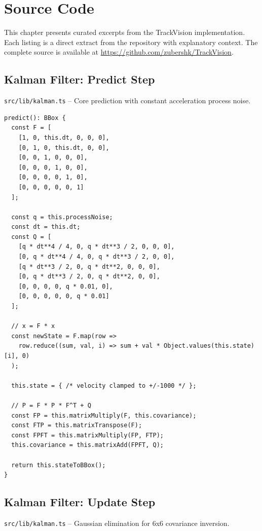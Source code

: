 \chapter{Source Code}
\label{ch:source-code}

This chapter presents curated excerpts from the TrackVision implementation. Each listing is a direct extract from the repository with explanatory context. The complete source is available at \url{https://github.com/zubershk/TrackVision}.

\section{Kalman Filter: Predict Step}
\label{sec:code-kf-predict}
\texttt{src/lib/kalman.ts} -- Core prediction with constant acceleration process noise.

\begin{lstlisting}[style=typescript, caption={KalmanFilter.predict()}, label={lst:kf-predict}]
predict(): BBox {
  const F = [
    [1, 0, this.dt, 0, 0, 0],
    [0, 1, 0, this.dt, 0, 0],
    [0, 0, 1, 0, 0, 0],
    [0, 0, 0, 1, 0, 0],
    [0, 0, 0, 0, 1, 0],
    [0, 0, 0, 0, 0, 1]
  ];

  const q = this.processNoise;
  const dt = this.dt;
  const Q = [
    [q * dt**4 / 4, 0, q * dt**3 / 2, 0, 0, 0],
    [0, q * dt**4 / 4, 0, q * dt**3 / 2, 0, 0],
    [q * dt**3 / 2, 0, q * dt**2, 0, 0, 0],
    [0, q * dt**3 / 2, 0, q * dt**2, 0, 0],
    [0, 0, 0, 0, q * 0.01, 0],
    [0, 0, 0, 0, 0, q * 0.01]
  ];

  // x = F * x
  const newState = F.map(row =>
    row.reduce((sum, val, i) => sum + val * Object.values(this.state)[i], 0)
  );

  this.state = { /* velocity clamped to +/-1000 */ };

  // P = F * P * F^T + Q
  const FP = this.matrixMultiply(F, this.covariance);
  const FTP = this.matrixTranspose(F);
  const FPFT = this.matrixMultiply(FP, FTP);
  this.covariance = this.matrixAdd(FPFT, Q);

  return this.stateToBBox();
}
\end{lstlisting}

\section{Kalman Filter: Update Step}
\label{sec:code-kf-update}
\texttt{src/lib/kalman.ts} -- Gaussian elimination for 6x6 covariance inversion.

